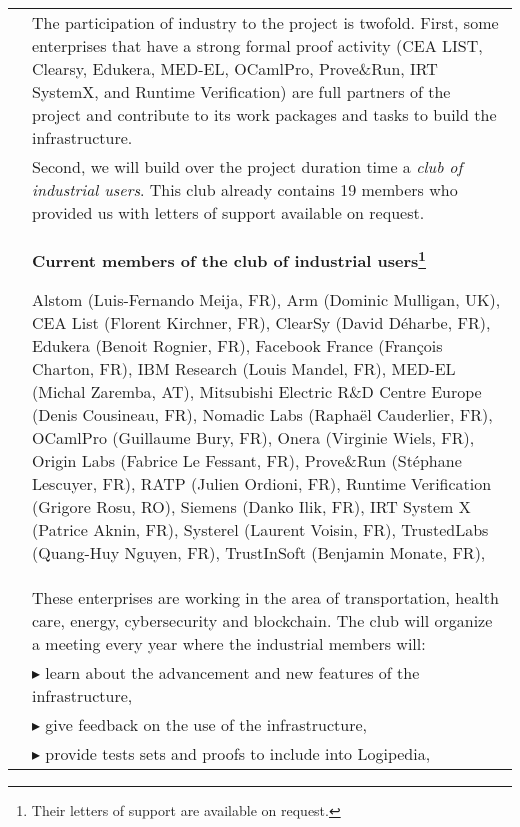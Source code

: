 \begin{longtable}{|p{}|p{}|}
&
\hspace{0.4cm}
The participation of industry to the project is twofold. First,
some enterprises that have a strong formal proof activity (CEA
LIST, Clearsy, Edukera, MED-EL, OCamlPro, Prove\&Run, IRT SystemX,
and Runtime Verification) are full partners of the project and
contribute to its work packages and tasks to build the
infrastructure.
\\
&
\hspace{0.4cm}
Second, we will build over the project duration time a {\em club of
  industrial users}. This club already contains
19 members who provided us with letters of support available on request.
\\
&
\hspace{0.4cm}
\definecolor{shadecolor}{named}{color1}
\begin{shaded}
\begin{center}
  {\bf\large Current members of the club of industrial users\footnote{Their letters of support are available on request.}}
\end{center}
Alstom (Luis-Fernando Meija, FR),
Arm (Dominic Mulligan, UK),
CEA List (Florent Kirchner, FR),
ClearSy (David Déharbe, FR),
Edukera (Benoit Rognier, FR),
Facebook France (François Charton, FR),
IBM Research (Louis Mandel, FR),
MED-EL (Michal Zaremba, AT),
Mitsubishi Electric R\&D Centre Europe (Denis Cousineau, FR),
Nomadic Labs (Raphaël Cauderlier, FR),
OCamlPro (Guillaume Bury, FR),
Onera (Virginie Wiels, FR),
Origin Labs (Fabrice Le Fessant, FR),
Prove\&Run (Stéphane Lescuyer, FR),
RATP (Julien Ordioni, FR),
Runtime Verification (Grigore Rosu, RO),
Siemens (Danko Ilik, FR),
IRT System X (Patrice Aknin, FR),
Systerel (Laurent Voisin, FR),
TrustedLabs (Quang-Huy Nguyen, FR),
TrustInSoft (Benjamin Monate, FR),
\end{shaded}\\
&
\hspace{0.4cm}
These enterprises are working in the area of transportation, health
care, energy, cybersecurity and blockchain.
The club will organize a meeting every year where the
industrial members will:\\
&
$\blacktriangleright$
learn about the advancement and new features of the infrastructure,\\
&
$\blacktriangleright$
give feedback on the use of the infrastructure,
\\
&
$\blacktriangleright$ provide tests sets and proofs to include into Logipedia,
\\

\end{longtable}
